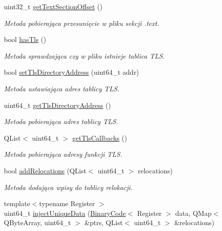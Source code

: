 \begin{DoxyCompactItemize}
uint32\-\_\-t \hyperlink{class_p_e_file_afdcc62870de787ebaee455b55af8f06f}{get\-Text\-Section\-Offset} ()
\begin{DoxyCompactList}\small\item\em Metoda pobierająca przesunięcie w pliku sekcji .text. \end{DoxyCompactList}\item 
bool \hyperlink{class_p_e_file_aecfb5938f29e1cb030e968349b3112ef}{has\-Tls} ()
\begin{DoxyCompactList}\small\item\em Metoda sprawdzająca czy w pliku istnieje tablica T\-L\-S. \end{DoxyCompactList}\item 
bool \hyperlink{class_p_e_file_a6cd64df26158260f265b26e40b3b5dea}{set\-Tls\-Directory\-Address} (uint64\-\_\-t addr)
\begin{DoxyCompactList}\small\item\em Metoda ustawiająca adres tablicy T\-L\-S. \end{DoxyCompactList}\item 
uint64\-\_\-t \hyperlink{class_p_e_file_a6a98e9259a0013bff708271b378648ef}{get\-Tls\-Directory\-Address} ()
\begin{DoxyCompactList}\small\item\em Metoda pobierająca adres tablicy T\-L\-S. \end{DoxyCompactList}\item 
Q\-List$<$ uint64\-\_\-t $>$ \hyperlink{class_p_e_file_af718219d753f57388e3db28a55928b3e}{get\-Tls\-Callbacks} ()
\begin{DoxyCompactList}\small\item\em Metoda pobierająca adresy funkcji T\-L\-S. \end{DoxyCompactList}\item 
bool \hyperlink{class_p_e_file_ab6f1b8483aeba41b153aa27e9c6a0b8b}{add\-Relocations} (Q\-List$<$ uint64\-\_\-t $>$ relocations)
\begin{DoxyCompactList}\small\item\em Metoda dodająca wpisy do tablicy relokacji. \end{DoxyCompactList}\item 
{\footnotesize template$<$typename Register $>$ }\\uint64\-\_\-t \hyperlink{class_p_e_file_ab14d9fb29123545e0a7528795e64d3c1}{inject\-Unique\-Data} (\hyperlink{class_binary_code}{Binary\-Code}$<$ Register $>$ data, Q\-Map$<$ Q\-Byte\-Array, uint64\-\_\-t $>$ \&ptrs, Q\-List$<$ uint64\-\_\-t $>$ \&relocations)

\end{DoxyCompactItemize}
